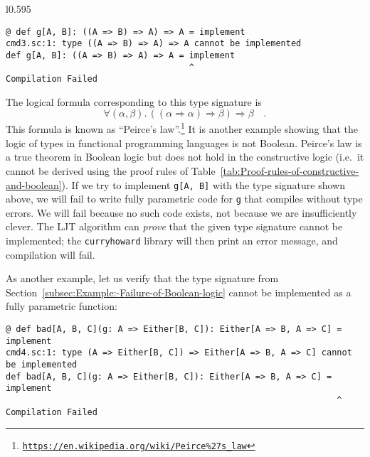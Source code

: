 \begin{wrapfigure}{l}{0.595\columnwidth}%
\vspace{-0.6\baselineskip}
\begin{lstlisting}
@ def g[A, B]: ((A => B) => A) => A = implement
cmd3.sc:1: type ((A => B) => A) => A cannot be implemented
def g[A, B]: ((A => B) => A) => A = implement
                                    ^
Compilation Failed
\end{lstlisting}

\vspace{-0.9\baselineskip}
\end{wrapfigure}%

\noindent The logical formula corresponding to this type signature
is 
\begin{equation}
\forall(\alpha,\beta).\,\left(\left(\alpha\Rightarrow\alpha\right)\Rightarrow\beta\right)\Rightarrow\beta\quad.\label{eq:ch-example-3-peirce-law}
\end{equation}
This formula is known as ``Peirce's law''.\footnote{\texttt{\href{https://en.wikipedia.org/wiki/Peirce\%27s_law}{https://en.wikipedia.org/wiki/Peirce\%27s\_law}}}
It is another example showing that the logic of types in functional
programming languages is not Boolean. Peirce's law is a true theorem
in Boolean logic but does not hold in the constructive logic (i.e.~it
cannot be derived using the proof rules of Table~\ref{tab:Proof-rules-of-constructive-and-boolean}).
If we try to implement \lstinline!g[A, B]! with the type signature
shown above, we will fail to write fully parametric code for \lstinline!g!
that compiles without type errors. We will fail because no such code
exists, \textendash{} not because we are insufficiently clever. The
LJT algorithm can \emph{prove} that the given type signature cannot
be implemented; the \texttt{curryhoward} library will then print an
error message, and compilation will fail.

As another example, let us verify that the type signature from Section~\ref{subsec:Example:-Failure-of-Boolean-logic}
cannot be implemented as a fully parametric function:
\begin{lstlisting}
@ def bad[A, B, C](g: A => Either[B, C]): Either[A => B, A => C] = implement
cmd4.sc:1: type (A => Either[B, C]) => Either[A => B, A => C] cannot be implemented
def bad[A, B, C](g: A => Either[B, C]): Either[A => B, A => C] = implement
                                                                 ^
Compilation Failed
\end{lstlisting}


